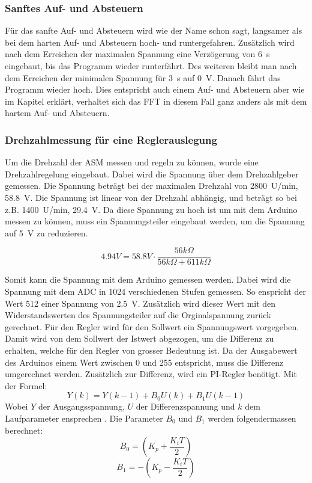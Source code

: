 \subsubsection{Sanftes Auf- und Absteuern}
Für das sanfte Auf- und Absteuern wird wie der Name schon sagt, langsamer als bei dem harten Auf- und Absteuern hoch- und runtergefahren. Zusätzlich wird nach dem Erreichen der maximalen Spannung eine Verzögerung von \SI{6}{s} eingebaut, bis das Programm wieder runterfährt. Des weiteren bleibt man nach dem Erreichen der minimalen Spannung für \SI{3}{s} auf \SI{0}{V}. Danach fährt das Programm wieder hoch. Dies entspricht auch einem Auf- und Absteuern aber wie im Kapitel  erklärt, verhaltet sich das FFT in diesem Fall ganz anders als mit dem hartem Auf- und Absteuern.

\subsubsection{Drehzahlmessung für eine Reglerauslegung}
Um die Drehzahl der ASM messen und regeln zu können, wurde eine Drehzahlregelung eingebaut. Dabei wird die Spannung über dem Drehzahlgeber gemessen. Die Spannung beträgt bei der maximalen Drehzahl von \SI{2800}{U/min}, \SI{58.8}{V}. Die Spannung ist linear von der Drehzahl abhängig, und beträgt so bei z.B. \SI{1400}{U/min}, \SI{29.4}{V}. Da diese Spannung zu hoch ist um mit dem Arduino messen zu können, muss ein Spannungsteiler eingebaut werden, um die Spannung auf \SI{5}{V} zu reduzieren. 

\begin{equation}
4.94 V = 58.8 V \cdot \frac{56k\Omega}{56k\Omega + 611k\Omega}
\end{equation}

Somit kann die Spannung mit dem Arduino gemessen werden. Dabei wird die Spannung mit dem ADC in 1024 verschiedenen Stufen gemessen. So enspricht der Wert 512 einer Spannung von \SI{2.5}{V}.
 Zusätzlich wird dieser Wert mit den Widerstandswerten des Spannungsteiler auf die Orginalspannung zurück gerechnet. Für den Regler wird für den Sollwert ein Spannungswert vorgegeben. Damit wird von dem Sollwert der Istwert abgezogen, um die Differenz zu erhalten, welche für den Regler von grosser Bedeutung ist. Da der Ausgabewert des Arduinos einem Wert zwischen 0 und 255 entspricht, muss die Differenz umgerechnet werden. Zusätzlich zur Differenz, wird ein PI-Regler benötigt. 
Mit der Formel: \cite{Quelle_Marco} 
\begin{equation}
Y(k) = Y(k-1)+ B_0U(k)+B_1U(k-1)
\end{equation}
Wobei $Y$ der Ausgangsspannung, $U$ der Differenzspannung und $k$ dem Laufparameter ensprechen \cite{PI_Regler}. Die Parameter $B_0$ und $B_1$ werden folgendermassen berechnet:
\begin{equation}\label{eq:B0}
B_0 = \left(K_p + \frac{K_iT}{2}\right) 
\end{equation}
\begin{equation}\label{eq:B1}
B_1 = -\left(K_p - \frac{K_iT}{2}\right) 
\end{equation}

